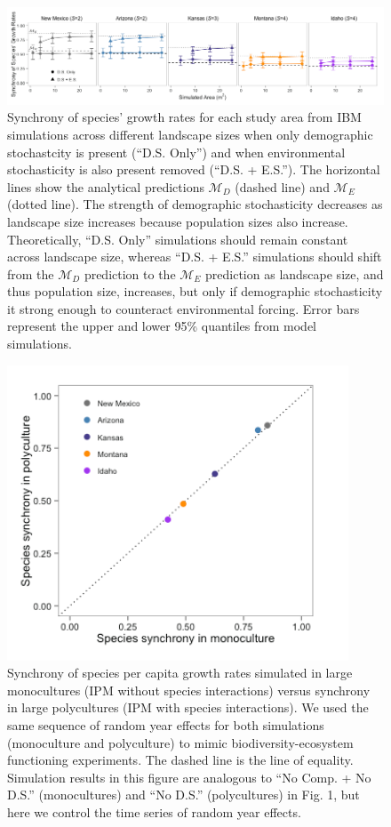 \documentclass[12pt,]{article}
\begin{document}
\begin{figure}[!ht]
  \centering
      \includegraphics[width=6in]{./components/formatted_figures/formatted_figure2.png}
  \caption{Synchrony of species' growth rates for each study area from IBM simulations across different landscape sizes when only demographic stochastcity is present (``D.S. Only'') and when environmental stochasticity is also present removed (``D.S. + E.S.''). The horizontal lines show the analytical predictions $\mathcal{M}_D$ (dashed line) and $\mathcal{M}_E$ (dotted line). The strength of demographic stochasticity decreases as landscape size increases because population sizes also increase. Theoretically, ``D.S. Only'' simulations should remain constant across landscape size, whereas ``D.S. + E.S.'' simulations should shift from the $\mathcal{M}_D$ prediction to the $\mathcal{M}_E$ prediction as landscape size, and thus population size, increases, but only if demographic stochasticity it strong enough to counteract environmental forcing. Error bars represent the upper and lower 95\% quantiles from model simulations.}
\end{figure}

\pagebreak{}

\begin{figure}[!ht]
  \centering
      \includegraphics[width=4in]{./components/formatted_figures/formatted_figure3.png}
  \caption{Synchrony of species per capita growth rates simulated in large monocultures (IPM without species interactions) versus synchrony in large polycultures (IPM with species interactions). We used the same sequence of random year effects for both simulations (monoculture and polyculture) to mimic biodiversity-ecosystem functioning experiments. The dashed line is the line of equality. Simulation results in this figure are analogous to ``No Comp. + No D.S.'' (monocultures) and ``No D.S.'' (polycultures) in Fig. 1, but here we control the time series of random year effects.}
\end{figure}

\pagebreak{}
\end{document}
